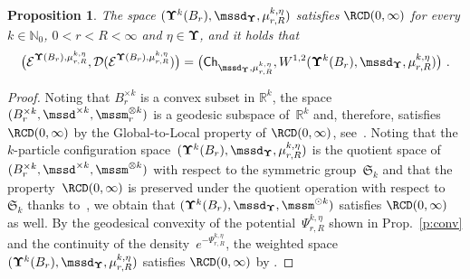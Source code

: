 \documentclass[11pt,letterpaper]{amsart}
\newcommand{\Ch}{\mathsf{Ch}}
\newcommand{\N}{{\mathbb N}}
\newcommand{\R}{{\mathbb R}}
\newcommand{\fstop}{\,\,\mathrm{.}}
\newcommand{\purple}[1]{{\color{purple}#1}}
\newcommand{\dUpsilon}{{\mathbf \Upsilon}}
\newcommand{\U}{\dUpsilon}
\newcommand{\E}{\mathcal E}
\renewcommand{\1}{\mathbf 1}
\numberwithin{equation}{section}
\theoremstyle{plain}
\newtheorem{prop}[thm]{Proposition}%
\theoremstyle{definition}
\theoremstyle{remark}
\begin{document}
\begin{prop} \label{p:BE1}
The space $(\U^k(B_r), \mssd_\U, \mu_{r, R}^{k, \eta})$ satisfies $\RCD(0, \infty)$ for every $k \in \N_0$, $0<r<R<\infty$ and $\eta \in \U$, and it holds that 
$$\bigl(\E^{\U(B_r), \mu_{r, R}^{k, \eta}}, \mathcal D(\E^{\U(B_r), \mu_{r, R}^{k, \eta}}) \bigr)=\bigl(\Ch_{\mssd_\U, \mu_{r, R}^{k, \eta}}, W^{1,2}(\U^k(B_r), \mssd_\U, \mu_{r, R}^{k, \eta})\bigr) \fstop$$ 
\end{prop}
\begin{proof}
Noting that $B_r^{\times k}$ is a convex subset in $\R^{k}$, the space $(B_r^{\times k}, \mssd^{\times k}, \mssm_r^{\otimes k})$ is a geodesic subspace of~$\R^{k}$ and, therefore, satisfies $\RCD(0, \infty)$ by the Global-to-Local property of $\RCD(0,\infty)$, see~\cite[Thm.~6.20]{AmbGigSav14b}. 
Noting that the $k$-particle configuration space~$(\U^k(B_r), \mssd_\U, \mu_{r, R}^{k, \eta})$ is the quotient space of~$(B_r^{\times k}, \mssd^{\times k}, \mssm^{\otimes k})$  with respect to the symmetric group~$\mathfrak S_k$ and that the property~$\RCD(0,\infty)$ is preserved under the quotient operation with respect to~$\mathfrak S_k$ thanks to~\cite{GalKelMonSos18}, we obtain that $(\U^k(B_r), \mssd_\U, \mssm^{\odot k})$ satisfies $\RCD(0, \infty)$ as well. By the geodesical convexity of the potential~$\Psi_{r, R}^{k, \eta}$ shown in Prop.~\ref{p:conv} and the continuity of the density~$e^{-\Psi_{r, R}^{k, \eta}}$, the weighted space $(\U^k(B_r), \mssd_\U, \mu_{r, R}^{k, \eta})$ satisfies $\RCD(0,\infty)$ by \cite[Prop.~6.21]{AmbGigSav14b}.


\end{proof}
\end{document}
